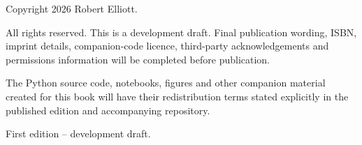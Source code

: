 \thispagestyle{empty}
\small

\vspace*{\fill}

Copyright \textcopyright{} 2026 Robert Elliott.

\medskip

All rights reserved. This is a development draft. Final publication wording,
ISBN, imprint details, companion-code licence, third-party acknowledgements and
permissions information will be completed before publication.

\medskip

The Python source code, notebooks, figures and other companion material created
for this book will have their redistribution terms stated explicitly in the
published edition and accompanying repository.

\medskip

First edition -- development draft.
